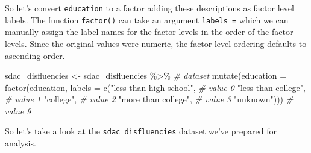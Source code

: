 \documentclass[
]{article}
\newenvironment{Shaded}{\begin{snugshade}}{\end{snugshade}}
\newcommand{\AttributeTok}[1]{\textcolor[rgb]{0.77,0.63,0.00}{#1}}
\newcommand{\CommentTok}[1]{\textcolor[rgb]{0.56,0.35,0.01}{\textit{#1}}}
\newcommand{\FunctionTok}[1]{\textcolor[rgb]{0.00,0.00,0.00}{#1}}
\newcommand{\NormalTok}[1]{#1}
\newcommand{\OtherTok}[1]{\textcolor[rgb]{0.56,0.35,0.01}{#1}}
\newcommand{\SpecialCharTok}[1]{\textcolor[rgb]{0.00,0.00,0.00}{#1}}
\newcommand{\StringTok}[1]{\textcolor[rgb]{0.31,0.60,0.02}{#1}}
\begin{document}
So let's convert \texttt{education} to a factor adding these descriptions as factor level labels. The function \texttt{factor()} can take an argument \texttt{labels\ =} which we can manually assign the label names for the factor levels in the order of the factor levels. Since the original values were numeric, the factor level ordering defaults to ascending order.

\begin{Shaded}
\begin{Highlighting}[]
\NormalTok{sdac\_disfluencies }\OtherTok{\textless{}{-}} 
\NormalTok{  sdac\_disfluencies }\SpecialCharTok{\%\textgreater{}\%} \CommentTok{\# dataset}
  \FunctionTok{mutate}\NormalTok{(}\AttributeTok{education =} \FunctionTok{factor}\NormalTok{(education, }
                            \AttributeTok{labels =} \FunctionTok{c}\NormalTok{(}\StringTok{"less than high school"}\NormalTok{, }\CommentTok{\# value 0}
                                       \StringTok{"less than college"}\NormalTok{, }\CommentTok{\# value 1}
                                       \StringTok{"college"}\NormalTok{, }\CommentTok{\# value 2}
                                       \StringTok{"more than college"}\NormalTok{, }\CommentTok{\# value 3 }
                                       \StringTok{"unknown"}\NormalTok{))) }\CommentTok{\# value 9}
\end{Highlighting}
\end{Shaded}

So let's take a look at the \texttt{sdac\_disfluencies} dataset we've prepared for analysis.

\begin{Shaded}
\end{Shaded}
\end{document}
